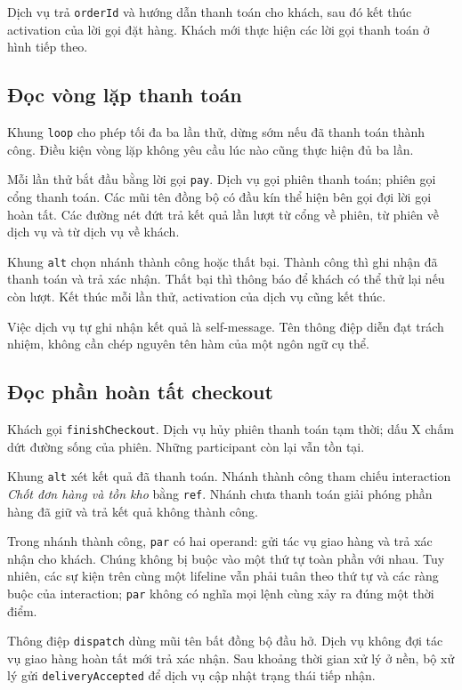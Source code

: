 \documentclass[12pt,a4paper]{article}
\newcommand{\code}[1]{\texttt{#1}}
\begin{document}
Dịch vụ trả \code{orderId} và hướng dẫn thanh toán cho khách, sau đó kết thúc activation của lời gọi đặt hàng. Khách mới thực hiện các lời gọi thanh toán ở hình tiếp theo.

\subsection{Đọc vòng lặp thanh toán}
Khung \code{loop} cho phép tối đa ba lần thử, dừng sớm nếu đã thanh toán thành công. Điều kiện vòng lặp không yêu cầu lúc nào cũng thực hiện đủ ba lần.

Mỗi lần thử bắt đầu bằng lời gọi \code{pay}. Dịch vụ gọi phiên thanh toán; phiên gọi cổng thanh toán. Các mũi tên đồng bộ có đầu kín thể hiện bên gọi đợi lời gọi hoàn tất. Các đường nét đứt trả kết quả lần lượt từ cổng về phiên, từ phiên về dịch vụ và từ dịch vụ về khách.

Khung \code{alt} chọn nhánh thành công hoặc thất bại. Thành công thì ghi nhận đã thanh toán và trả xác nhận. Thất bại thì thông báo để khách có thể thử lại nếu còn lượt. Kết thúc mỗi lần thử, activation của dịch vụ cũng kết thúc.

Việc dịch vụ tự ghi nhận kết quả là self-message. Tên thông điệp diễn đạt trách nhiệm, không cần chép nguyên tên hàm của một ngôn ngữ cụ thể.

\subsection{Đọc phần hoàn tất checkout}
Khách gọi \code{finishCheckout}. Dịch vụ hủy phiên thanh toán tạm thời; dấu X chấm dứt đường sống của phiên. Những participant còn lại vẫn tồn tại.

Khung \code{alt} xét kết quả đã thanh toán. Nhánh thành công tham chiếu interaction \emph{Chốt đơn hàng và tồn kho} bằng \code{ref}. Nhánh chưa thanh toán giải phóng phần hàng đã giữ và trả kết quả không thành công.

Trong nhánh thành công, \code{par} có hai operand: gửi tác vụ giao hàng và trả xác nhận cho khách. Chúng không bị buộc vào một thứ tự toàn phần với nhau. Tuy nhiên, các sự kiện trên cùng một lifeline vẫn phải tuân theo thứ tự và các ràng buộc của interaction; \code{par} không có nghĩa mọi lệnh cùng xảy ra đúng một thời điểm.

Thông điệp \code{dispatch} dùng mũi tên bất đồng bộ đầu hở. Dịch vụ không đợi tác vụ giao hàng hoàn tất mới trả xác nhận. Sau khoảng thời gian xử lý ở nền, bộ xử lý gửi \code{deliveryAccepted} để dịch vụ cập nhật trạng thái tiếp nhận.
\end{document}
